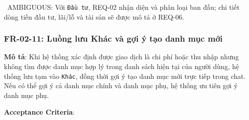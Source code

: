 \warningicon\  AMBIGUOUS: Với \texttt{Đầu tư}, REQ-02 nhận diện và phân loại ban đầu; chi tiết dòng tiền đầu tư, lãi/lỗ và tài sản sẽ được mô tả ở REQ-06.



\subsubsection{FR-02-11: Luồng lưu Khác và gợi ý tạo danh mục mới}

\textbf{Mô tả}: Khi hệ thống xác định được giao dịch là chi phí hoặc thu nhập nhưng không tìm được danh mục hợp lý trong danh sách hiện tại của người dùng, hệ thống lưu tạm vào \texttt{Khác}, đồng thời gợi ý tạo danh mục mới trực tiếp trong chat. Nếu có thể gợi ý cả danh mục chính và danh mục phụ, hệ thống ưu tiên gợi ý danh mục phụ.



\textbf{Acceptance Criteria}:

